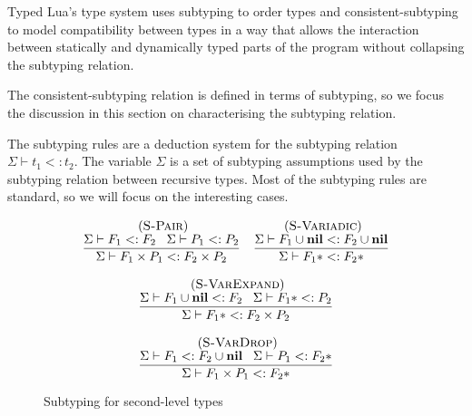 \documentclass[preprint]{sigplanconf}
\newcommand{\Nil}{\mathbf{nil}}
\newcommand{\mylabel}[1]{\; (\textsc{#1})}
\newcommand{\senv}{\Sigma}
\newcommand{\subtype}{<:}
\begin{document}
Typed Lua's type system uses subtyping to order
types and  consistent-subtyping~\cite{siek2007objects,siek2013mutable}
to model compatibility between types in a way that allows
the interaction between statically and dynamically typed
parts of the program without collapsing the subtyping
relation.

The consistent-subtyping relation is defined in terms
of subtyping, so we focus the discussion in this section
on characterising the subtyping relation.

The subtyping rules are a deduction system for the
subtyping relation $\senv \vdash t_{1} \subtype t_{2}$.
The variable $\senv$ is a set of subtyping assumptions used
by the subtyping relation between recursive types. 
Most of the subtyping rules are standard, so we will
focus on the interesting cases.

\begin{figure}[t]
\label{fig:subtuples}
\[
\begin{array}{c}
\begin{array}{c}
\mylabel{S-Pair}\\
\dfrac{\senv \vdash F_{1} \subtype F_{2} \;\;\;
	\senv \vdash P_{1} \subtype P_{2}}
{\senv \vdash F_{1} \times P_{1} \subtype F_{2} \times P_{2}}
\end{array}
\begin{array}{c}
\mylabel{S-Variadic}\\
\dfrac{\senv \vdash F_{1} \cup \Nil \subtype F_{2} \cup \Nil}
{\senv \vdash F_{1}{*} \subtype F_{2}{*}}
\end{array}\\\\
\begin{array}{c}
\mylabel{S-VarExpand}\\
\dfrac{\senv \vdash F_{1} \cup \Nil \subtype F_{2} \;\;\;
	\senv \vdash F_{1}{*} \subtype P_{2}}
{\senv \vdash F_{1}{*} \subtype F_{2} \times P_{2}}
\end{array}
\\ \\
\begin{array}{c}
\mylabel{S-VarDrop}\\
\dfrac{\senv \vdash F_{1} \subtype F_{2} \cup \Nil \;\;\;
	\senv \vdash P_{1} \subtype F_{2}{*}}
{\senv \vdash F_{1} \times P_{1} \subtype F_{2}{*}}
\end{array}
\end{array}
\]
\caption{Subtyping for second-level types}	
\end{figure}
\end{document}
